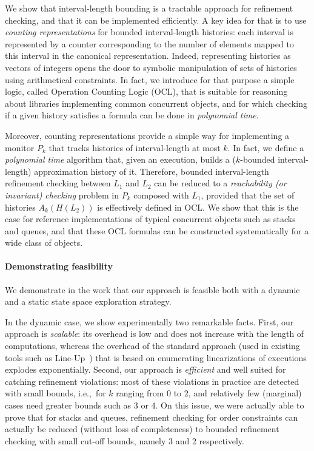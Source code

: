 We show that interval-length bounding is a tractable approach for refinement
checking, and that it can be implemented efficiently. A key idea for that is to
use \emph{counting representations} for bounded interval-length histories: each
interval is represented by a counter corresponding to the number of elements
mapped to this interval in the canonical representation. Indeed, representing
histories as vectors of integers opens the door to symbolic manipulation of
sets of histories using arithmetical constraints. In fact, we introduce for
that purpose a simple logic, called Operation Counting Logic (OCL), that is
suitable for reasoning about libraries implementing common concurrent objects,
and for which checking if a given history satisfies a formula can be done in
\emph{polynomial time}.

Moreover, counting representations provide a simple way for implementing a
monitor $P_k$ that tracks histories of interval-length at most $k$. In fact, we
define a \emph{polynomial time} algorithm that, given an execution, builds a
($k$-bounded interval-length) approximation history of it. Therefore, bounded
interval-length refinement checking between $L_1$ and $L_2$ can be reduced to a
\emph{reachability (or invariant) checking} problem in $P_k$ composed with
$L_1$, provided that the set of histories $A_k(H(L_2))$ is effectively defined
in OCL. We show that this is the case for reference implementations of typical
concurrent objects such as stacks and queues, and that these OCL formulas can
be constructed systematically for a wide class of objects.

\paragraph{Demonstrating feasibility}

We demonstrate in the work that our approach is feasible both with a dynamic
and a static state space exploration strategy.

In the dynamic case, we show experimentally two remarkable facts. First, our
approach is \emph{scalable}: its overhead is low and does not increase with the
length of computations, whereas the overhead of the standard approach (used in
existing tools such as Line-Up~\cite{conf/pldi/BurckhardtDMT10}) that is based
on enumerating linearizations of executions explodes exponentially. Second, our
approach is \emph{efficient} and well suited for catching refinement
violations: most of these violations in practice are detected with small
bounds, i.e.,~for $k$ ranging from 0 to $2$, and relatively few (marginal)
cases need greater bounds such as 3 or 4. On this issue, we were actually able
to prove that for stacks and queues, refinement checking for order constraints
can actually be reduced (without loss of completeness) to bounded refinement
checking with small cut-off bounds, namely 3 and 2 respectively.

